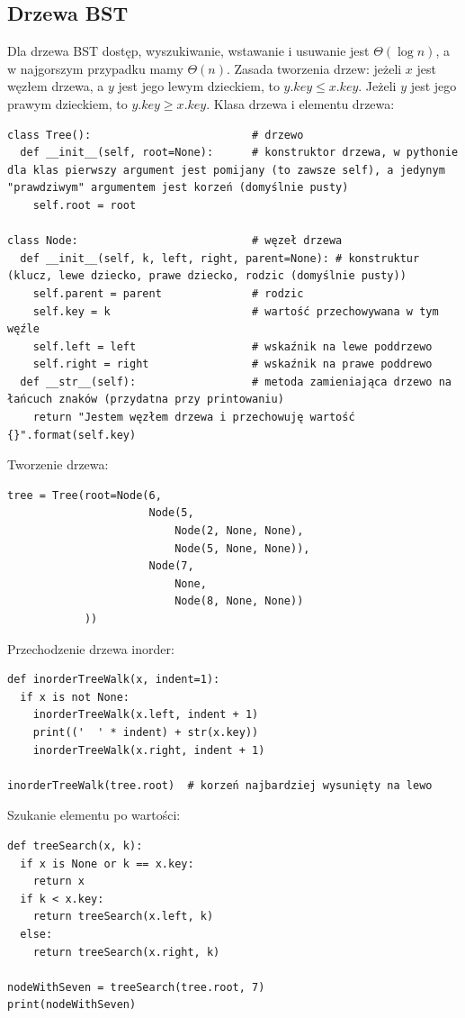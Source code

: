\documentclass[10pt, oneside]{article}
\theoremstyle{remark}
\begin{document}
\subsection{Drzewa BST}
Dla drzewa BST dostęp, wyszukiwanie, wstawanie i usuwanie jest $\Theta(\log n)$, a w najgorszym przypadku mamy $\Theta(n)$.
Zasada tworzenia drzew: jeżeli $x$ jest węzłem drzewa, a $y$ jest jego lewym dzieckiem, to $y.key \leq x.key$.
Jeżeli $y$ jest jego prawym dzieckiem, to $y.key \geq x.key$.
Klasa drzewa i elementu drzewa:
\begin{verbatim}
class Tree():                         # drzewo
  def __init__(self, root=None):      # konstruktor drzewa, w pythonie dla klas pierwszy argument jest pomijany (to zawsze self), a jedynym "prawdziwym" argumentem jest korzeń (domyślnie pusty)
    self.root = root                  

class Node:                           # węzeł drzewa
  def __init__(self, k, left, right, parent=None): # konstruktur (klucz, lewe dziecko, prawe dziecko, rodzic (domyślnie pusty))
    self.parent = parent              # rodzic 
    self.key = k                      # wartość przechowywana w tym węźle
    self.left = left                  # wskaźnik na lewe poddrzewo
    self.right = right                # wskaźnik na prawe poddrewo
  def __str__(self):                  # metoda zamieniająca drzewo na łańcuch znaków (przydatna przy printowaniu)
    return "Jestem węzłem drzewa i przechowuję wartość {}".format(self.key)
\end{verbatim}
Tworzenie drzewa:
\begin{verbatim}
tree = Tree(root=Node(6, 
                      Node(5, 
                          Node(2, None, None), 
                          Node(5, None, None)), 
                      Node(7, 
                          None, 
                          Node(8, None, None))
            ))
\end{verbatim}
Przechodzenie drzewa inorder:
\begin{verbatim}
def inorderTreeWalk(x, indent=1):
  if x is not None:
    inorderTreeWalk(x.left, indent + 1)
    print(('  ' * indent) + str(x.key))
    inorderTreeWalk(x.right, indent + 1)
    
inorderTreeWalk(tree.root)  # korzeń najbardziej wysunięty na lewo
\end{verbatim}
Szukanie elementu po wartości:
\begin{verbatim}
def treeSearch(x, k):
  if x is None or k == x.key:
    return x
  if k < x.key:
    return treeSearch(x.left, k)
  else:
    return treeSearch(x.right, k)
    
nodeWithSeven = treeSearch(tree.root, 7)
print(nodeWithSeven)
\end{verbatim}
\end{document}
